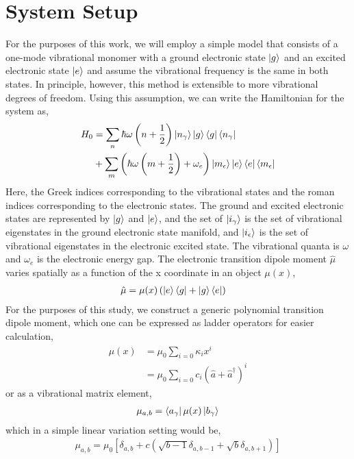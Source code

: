 \section{System Setup}
For the purposes of this work, we will employ a simple model that consists of a one-mode vibrational monomer with a ground electronic state $\ket{g}$ and an excited electronic state $\ket{e}$ and assume the vibrational frequency is the same in both states.  In principle, however, this method is extensible to more vibrational degrees of freedom.  Using this assumption, we can write the Hamiltonian for the system as,
\begin{align}
	H_0 &=  \sum_n \hbar \omega \left(n + \frac{1}{2} \right)  \ket{n_{\gamma}}\ket{g}\bra{g} \bra{n_{\gamma}} \\
   &+ \sum_m \left(  \hbar \omega  \left(m + \frac{1}{2} \right) + \omega_e \right)  \ket{m_{\epsilon}} \ket{e}\bra{e} \bra{m_{\epsilon}}
\end{align}
Here, the Greek indices corresponding to the vibrational states and the roman indices corresponding to the electronic states.  The ground and excited electronic states are represented by $\ket{g}$ and $\ket{e}$, and the set of $\ket{i_{\gamma}}$ is the set of vibrational eigenstates in the ground electronic state manifold, and $\ket{i_{\epsilon}}$ is the set of vibrational eigenstates in the electronic excited state.  The vibrational quanta is $\omega$ and $\omega_e$ is the electronic energy gap.  The electronic transition  dipole moment $\hat{\mu}$ varies spatially as a function of the x coordinate in an object $\mu(x)$,
\begin{align}
	\hat{\mu} &= \mu (x)  \left( \ket{e}\bra{g} + \ket{g} \bra{e} \right)
\end{align}
For the purposes of this study, we construct a generic polynomial transition dipole moment, which one can be expressed as ladder operators for easier calculation,
\begin{align}
	\mu(x) &= \mu_0 \sum_{i=0} \kappa_i x^i \\
	&= \mu_0 \sum_{i=0} c_i \left( \hat{a} + \hat{a}^{\dagger}\right)^i
\end{align}
or as a vibrational matrix element,
\begin{align}
	\mu_{a,b} = \bra{a_{\gamma}} \mu(x) \ket{b_{\gamma}}
\end{align}
which in a simple linear variation setting would be,
\begin{align}
	\mu_{a,b} = \mu_0 \left[ \delta_{a,b} + c \left( \sqrt{b-1}\delta_{a,b-1} + \sqrt{b}\delta_{a,b+1}\right) \right]
\end{align}



